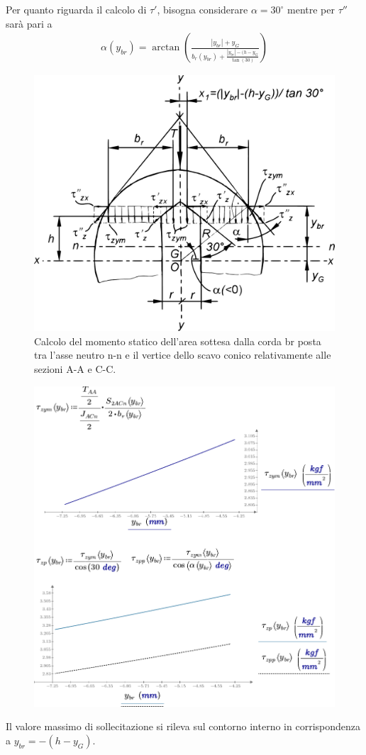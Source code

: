 Per quanto riguarda il calcolo di $\tau'$, bisogna considerare $\alpha=30^\circ$ mentre per $\tau''$ sarà pari a 
\begin{align*}
\alpha(y_{br}) = \arctan \left( \frac{|y_{br}|+y_G}{b_r(y_{br})+\frac{|y_{br}|-(h-y_G}{\tan(30)}} \right)
\end{align*}
\begin{figure}[H]
\centering
  \includegraphics[width=.45\textwidth]{imgs/Cap7/SezAsse11}
\caption{Calcolo del momento statico dell’area sottesa dalla corda br posta tra l’asse neutro n-n e il vertice dello scavo conico relativamente alle sezioni A-A e C-C.}
\label{fig:SezAsse11}
\end{figure}
\begin{figure}[H]
\centering
  \includegraphics[width=.75\textwidth]{imgs/MathAsse5_2}
\caption{}
\label{fig:MathAsse5_2}
\end{figure}
Il valore massimo di sollecitazione si rileva sul contorno interno in corrispondenza a $y_{br} = -(h-y_G)$. 


